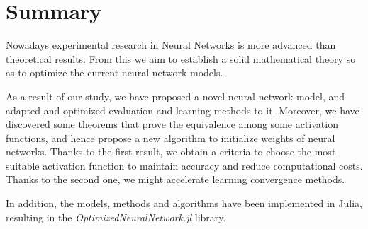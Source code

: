 %

\chapter*{Summary}\label{ch:summary}

Nowadays experimental research in Neural Networks is more advanced than theoretical
results. 
From this we aim to establish a solid mathematical theory so as to optimize the current neural network models. 


As a result of our study, we have proposed a novel neural 
network model, and adapted and optimized
evaluation and learning methods to it. 
Moreover, we have discovered some theorems that prove the 
equivalence among some activation functions, and hence propose a new
 algorithm to initialize weights of neural networks. Thanks to the
first result, we obtain a criteria to choose the most 
suitable activation function to maintain accuracy and reduce computational costs.
 Thanks to the second one, we might accelerate 
learning convergence methods.

In addition, the models, methods and algorithms have been 
implemented in Julia, resulting in the \textit{OptimizedNeuralNetwork.jl} library. 

